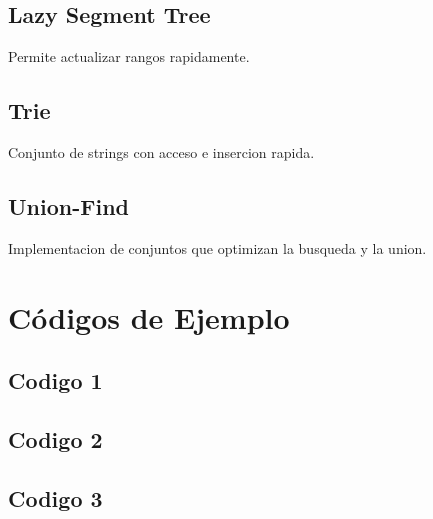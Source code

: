 \documentclass[11pt,a4paper,oneside]{book}
\newenvironment{programa}[2]{%
  \section{#1}%
  \noindent #2\par\medskip
}{%
  \medskip
}
\begin{document}
\begin{programa}{Lazy Segment Tree}{Permite actualizar rangos rapidamente.}
    
\end{programa}

\begin{programa}{Trie}{Conjunto de strings con acceso e insercion rapida.}
    
\end{programa}

\begin{programa}{Union-Find}{Implementacion de conjuntos que optimizan la busqueda y la union.}
    
\end{programa}

\chapter{Códigos de Ejemplo}

\begin{programa}{Codigo 1}{}
    
\end{programa}

\begin{programa}{Codigo 2}{}
    
\end{programa}

\begin{programa}{Codigo 3}{}
    
\end{programa}

\backmatter
\end{document}
